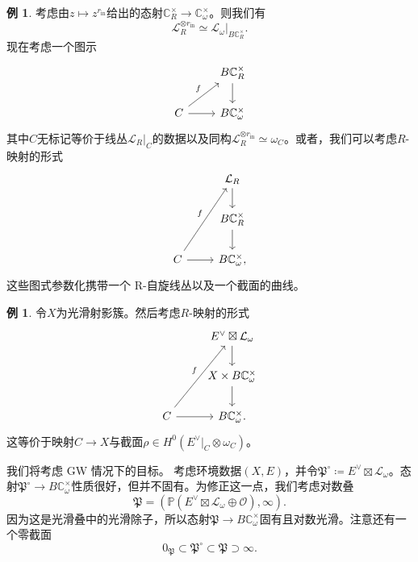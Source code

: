 \documentclass{amsart}
\theoremstyle{definition}
\newtheorem{exm}[thm]{例}
\theoremstyle{remark}
\theoremstyle{plain}
\theoremstyle{definition}
\theoremstyle{remark}
\newcommand{\C}{\mathbb{C}}
\renewcommand{\P}{\mathbb{P}}
\newcommand{\mc}[1]{\mathcal{#1}}
\newcommand{\mf}[1]{\mathfrak{#1}}
\newcommand{\mr}[1]{\mathrm{#1}}
\newcommand{\1}{\mathbf{1}}
\newcommand{\2}{\mathbf{2}}
\newcommand{\3}{\mathbf{3}}
\begin{document}
\begin{exm}
考虑由\(z \mapsto z^{r_{\mr{in}}}\)给出的态射\(\C^{\times}_R \to \C^{\times}_{\omega}\)。则我们有
    \[ \mc{L}_R^{\otimes r_{\mr{in}}} \simeq \mc{L}_{\omega} |_{B \C_R^{\times}}. \]
现在考虑一个图示
    \begin{equation*}
    \begin{tikzcd}
        & B \C_R^{\times} \ar{d} \\
        C \ar{ur}{f} \ar{r} & B \C_{\omega}^{\times}
    \end{tikzcd}
    \end{equation*}
其中\(C\)无标记等价于线丛\(\mc{L}_R|_C\)的数据以及同构\(\mc{L}_R^{\otimes r_{\mr{in}}} \simeq \omega_C\)。或者，我们可以考虑\(R\)-映射的形式
    \begin{equation*}
    \begin{tikzcd}
        & \mc{L}_R \ar{d} \\
        & B \C_R^{\times} \ar{d} \\
        C \ar{uur}{f} \ar{r} & B \C_{\omega}^{\times},
    \end{tikzcd}
    \end{equation*}
    这些图式参数化携带一个 R-自旋线丛以及一个截面的曲线。
\end{exm}

\begin{exm}
令\(X\)为光滑射影簇。然后考虑\(R\)-映射的形式
    \begin{equation*}
    \begin{tikzcd}
        & E^{\vee} \boxtimes \mc{L}_{\omega} \ar{d} \\
        & X \times B \C_{\omega}^{\times} \ar{d} \\
        C \ar{uur}{f} \ar{r} & B \C_{\omega}^{\times}.
    \end{tikzcd}
    \end{equation*}
这等价于映射\(C \to X\)与截面\(\rho \in H^0(E^{\vee}|_C \otimes \omega_C)\)。
\end{exm}

我们将考虑 GW 情况下的目标。
考虑环境数据\((X, E)\)，并令\(\mf{P}^{\circ} \coloneqq E^{\vee} \boxtimes \mc{L}_{\omega}\)。态射\(\mf{P}^{\circ} \to B \C_{\omega}^{\times}\)性质很好，但并不固有。为修正这一点，我们考虑对数叠
\[ \mf{P} = ( \P(E^{\vee} \boxtimes \mc{L}_{\omega} \oplus \mc{O}) , \infty). \]
因为这是光滑叠中的光滑除子，所以态射\(\mf{P} \to B \C_{\omega}^{\times}\)固有且对数光滑。注意还有一个零截面
\[ 0_{\mf{P}} \subset \mf{P}^{\circ} \subset \mf{P} \supset \infty. \]
\end{document}
